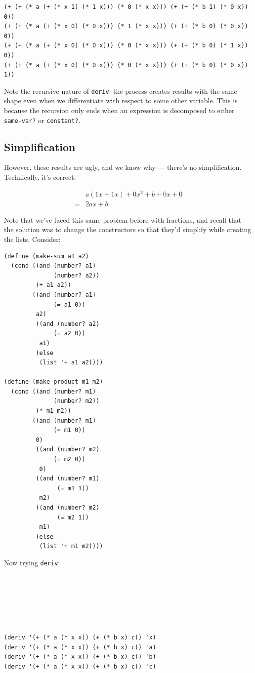 \documentclass[9pt]{report}
\begin{document}
\begin{verbatim}
(+ (+ (* a (+ (* x 1) (* 1 x))) (* 0 (* x x))) (+ (+ (* b 1) (* 0 x)) 0))
(+ (+ (* a (+ (* x 0) (* 0 x))) (* 1 (* x x))) (+ (+ (* b 0) (* 0 x)) 0))
(+ (+ (* a (+ (* x 0) (* 0 x))) (* 0 (* x x))) (+ (+ (* b 0) (* 1 x)) 0))
(+ (+ (* a (+ (* x 0) (* 0 x))) (* 0 (* x x))) (+ (+ (* b 0) (* 0 x)) 1))
\end{verbatim}


Note the recursive nature of \texttt{deriv}: the process creates results
with the same shape even when we differentiate with respect to
some other variable. This is because the recursion only ends when
an expression is decomposed to either \texttt{same-var?} or \texttt{constant?}.

\subsection{Simplification}
\label{sec:orgd35e6f2}

However, these results are ugly, and we know why --- there's no
simplification. Technically, it's correct:

\begin{align*}
&a(1x+1x) + 0x^{2} + b + 0x + 0\\
=& 2ax + b
\end{align*}

Note that we've faced this same problem before with fractions, and
recall that the solution was to change the constructors so that
they'd simplify while creating the lists. Consider:

\begin{verbatim}
(define (make-sum a1 a2)
  (cond ((and (number? a1)
              (number? a2))
         (+ a1 a2))
        ((and (number? a1)
              (= a1 0))
         a2)
         ((and (number? a2)
              (= a2 0))
          a1)
         (else
          (list '+ a1 a2))))

(define (make-product m1 m2)
  (cond ((and (number? m1)
              (number? m2))
         (* m1 m2))
        ((and (number? m1)
              (= m1 0))
         0)
         ((and (number? m2)
              (= m2 0))
          0)
         ((and (number? m1)
               (= m1 1))
          m2)
         ((and (number? m2)
               (= m2 1))
          m1)
         (else
          (list '+ m1 m2))))
\end{verbatim}

Now trying \texttt{deriv}:


\begin{verbatim}






(deriv '(+ (* a (* x x)) (+ (* b x) c)) 'x)
(deriv '(+ (* a (* x x)) (+ (* b x) c)) 'a)
(deriv '(+ (* a (* x x)) (+ (* b x) c)) 'b)
(deriv '(+ (* a (* x x)) (+ (* b x) c)) 'c)
\end{verbatim}
\end{document}
